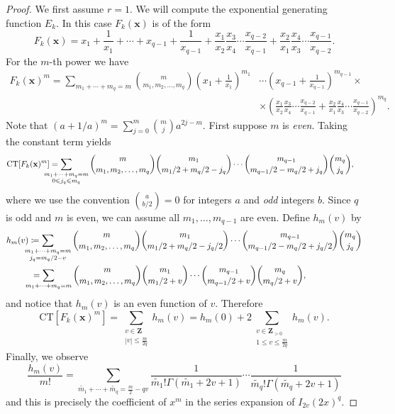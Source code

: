 \documentclass[12pt,reqno]{amsart}
\theoremstyle{definition}
\theoremstyle{plain}
\theoremstyle{definition}
\newcommand{\Z}{\mathbf{Z}}
\newcommand\x{\mathbf{x}}
\renewcommand{\leq}{\leqslant}
\begin{document}
\begin{proof}
	We first assume $r = 1$. We will compute the exponential generating function $E_k$. In this case $F_k(\x)$ is of the form 
	\[
	F_k(\x) = x_1 + \frac{1}{x_1} + \cdots + x_{q - 1} + \frac{1}{x_{q - 1}} + \frac{x_1}{x_2} \frac{x_3}{x_4} \cdots \frac{x_{q - 2}}{x_{q - 1}} + \frac{x_2}{x_1} \frac{x_4}{x_3} \cdots \frac{x_{q - 1}}{x_{q - 2}}.
	\]
	For the $m$-th power we have
	\begin{align*}
		F_k(\x)^m = \sum_{m_1 + \cdots + m_q = m} {m \choose m_{1},m_{2},\ldots ,m_{q}}
		\left(x_1 + \frac{1}{x_{1}}\right)^{m_1} &\cdots \left(x_{q - 1} + \frac{1}{x_{q - 1}}\right)^{m_{q - 1}} \times \\ &\times \left(\frac{x_1}{x_2} \frac{x_3}{x_4} \cdots \frac{x_{q - 2}}{x_{q - 1}} + \frac{x_2}{x_1} \frac{x_4}{x_3} \cdots \frac{x_{q - 1}}{x_{q - 2}} \right)^{m_q}.
	\end{align*}
	Note that $(a+1/a)^m = \sum\limits_{j=0}^m {m \choose j} a^{2j-m}$. 	
	First suppose $m$ is \emph{even}. Taking the constant term yields
	\begin{align*}
		\text{CT}[F_k(\textbf{x})^m] = \hspace*{-7mm} \sum_{\substack{m_1 + \cdots + m_q = m\\ 0 \leq j_q \leq m_q}}   {m \choose m_{1},m_{2},\ldots ,m_{q}} &\binom{m_1}{m_1/2 + m_q/2 - j_q}   \cdots \binom{m_{q -1}}{m_{q-1}/2 - m_q/2 + j_q} \binom{m_q}{j_q},
	\end{align*}
	where we use the convention $\binom{a}{b/2} = 0$ for integers $a$ and \emph{odd} integers $b$. Since $q$ is odd and $m$ is even, we can assume all $m_1, \ldots, m_{q-1}$ are even. 
	Define $h_m(v)$ by 
	\begin{align*}
		h_m(v) &\coloneqq \hspace*{-7mm}  \sum_{\substack{m_1 + \cdots + m_q = m\\ j_q = m_q/2 - v}} {m \choose m_{1},m_{2},\ldots ,m_{q}} \binom{m_1}{m_1/2 + m_q/2 - j_q/2} \cdots \binom{m_{q -1}}{m_{q-1}/2 - m_q/2 + j_q/2} \binom{m_q}{j_q} \\
		& \hspace{1mm} =  \hspace*{-7mm} \sum_{m_1 + \cdots + m_q = m} {m \choose m_{1},m_{2},\ldots ,m_{q}}  \binom{m_1}{m_1/2  + v} \cdots \binom{m_{q -1}}{m_{q-1}/2 + v} \binom{m_q}{m_q/2 + v},
	\end{align*}
	and notice that $h_m(v)$ is an even function of $v$. Therefore 
	\[
	\text{CT}[F_k(\textbf{x})^m] = \sum_{\substack{v \in \Z\\|v| \leq \frac{m}{2q}}} h_m(v) = h_m(0) + 2 \sum_{\substack{v \in \Z_{>0}\\1 \leq v  \leq \frac{m}{2q}}}  h_m(v).
	\]
Finally, we observe
	\[
	\frac{h_m(v)}{m!} = \sum_{\widetilde{m_1} + \cdots + \widetilde{m_q} = \frac{m}{2} - q v } \frac{1}{\widetilde{m_1}! \Gamma(\widetilde{m_1} + 2v + 1)} \cdots \frac{1}{\widetilde{m_q}!  \Gamma(\widetilde{m_q} + 2v + 1)}
	\]
	and this is precisely the coefficient of $x^m$ in the series expansion of $I_{2v}(2x)^q$. 
	

\end{proof}
\end{document}
